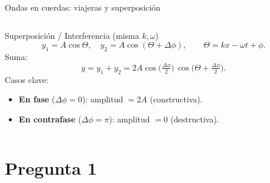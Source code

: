 \documentclass[
    10pt,
    aspectratio=169,
    xcolor={dvipsnames},
    spanish,
    ]{beamer}
\begin{document}
\begin{frame}{Ondas en cuerdas: viajeras y superposición}
\begin{columns}[T,totalwidth=\textwidth]
\begin{column}{0.5\textwidth}
\begin{block}{Superposición / Interferencia (misma $k,\omega$)}
        \[
          y_1=A\cos\Theta,\quad
          y_2=A\cos(\Theta+\Delta\phi),\qquad
          \Theta=kx-\omega t+\phi.
        \]
        Suma:
        \[
          y=y_1+y_2=
          2A\cos\!\Big(\tfrac{\Delta\phi}{2}\Big)\,
          \cos\!\Big(\Theta+\tfrac{\Delta\phi}{2}\Big).
        \]
        Casos clave:
        \begin{itemize}
          \item \textbf{En fase} ($\Delta\phi=0$): amplitud $=2A$ (constructiva).
          \item \textbf{En contrafase} ($\Delta\phi=\pi$): amplitud $=0$ (destructiva).
        \end{itemize}
  
      \end{block}
    \end{column}
  \end{columns}
\end{frame}




\section{Pregunta 1}
\end{document}
